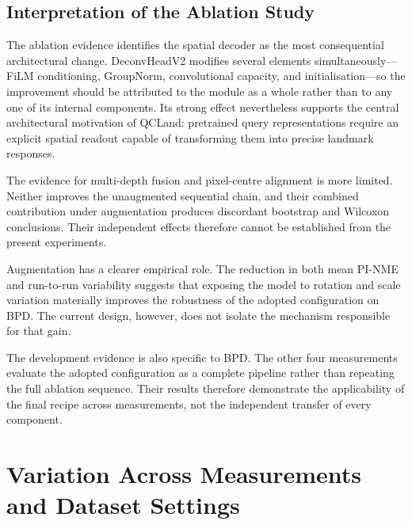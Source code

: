 \subsection{Interpretation of the Ablation Study}
\label{sec:discussion-development}
\label{sec:discussion-components}

The ablation evidence identifies the spatial decoder as the most
consequential architectural change. DeconvHeadV2 modifies several
elements simultaneously---FiLM conditioning, GroupNorm,
convolutional capacity, and initialisation---so the improvement should
be attributed to the module as a whole rather than to any one of its
internal components. Its strong effect nevertheless supports the
central architectural motivation of QCLand: pretrained query
representations require an explicit spatial readout capable of
transforming them into precise landmark responses.

The evidence for multi-depth fusion and pixel-centre alignment is more
limited. Neither improves the unaugmented sequential chain, and their
combined contribution under augmentation produces discordant bootstrap
and Wilcoxon conclusions. Their independent effects therefore cannot
be established from the present experiments.

Augmentation has a clearer empirical role. The reduction in both mean
PI-NME and run-to-run variability suggests that exposing the model to
rotation and scale variation materially improves the robustness of the
adopted configuration on BPD. The current design, however, does not
isolate the mechanism responsible for that gain.

The development evidence is also specific to BPD. The other four
measurements evaluate the adopted configuration as a complete pipeline
rather than repeating the full ablation sequence. Their results
therefore demonstrate the applicability of the final recipe across
measurements, not the independent transfer of every component.



\section{Variation Across Measurements and Dataset Settings}
\label{sec:discussion-variation}
\label{sec:discussion-multicentre-vs-ucl}


